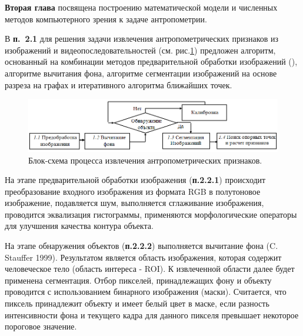 \textbf{Вторая глава} посвящена построению математической модели и численных методов компьютерного зрения к задаче антропометрии. 

В \textbf{п.~2.1} для решения задачи извлечения антропометрических признаков из изображений и видеопоследовательностей (см. рис.\ref{img53}) предложен алгоритм, основанный на комбинации  методов предварительной обработки изображений (), алгоритме вычитания фона, алгоритме сегментации изображений на основе разреза на графах и итеративного алгоритма ближайших точек.
\begin{figure}[ht!]
\centering
\includegraphics [width=1\linewidth] {images/h53.png}
\begin{center}
\caption{Блок-схема процесса извлечения антропометрических признаков.} \label{img53}
\end{center}
\end{figure}

На этапе предварительной обработки изображения (\textbf{п.2.2.1}) происходит преобразование входного изображения из формата RGB в полутоновое изображение, подавляется шум, выполняется сглаживание изображения, проводится эквализация гистограммы, применяются морфологические операторы для улучшения качества контура объекта.

На этапе обнаружения объектов (\textbf{п.2.2.2}) выполняется вычитание фона (C. Stauffer 1999). Результатом является область изображения, которая содержит человеческое тело (область интереса - ROI). К извлеченной области далее будет применена сегментация. Отбор пикселей, принадлежащих фону и объекту проводится с использованием бинарного изображения (маски). Считается, что пиксель принадлежит объекту и имеет белый цвет в маске, если разность интенсивности фона и текущего кадра для данного пикселя превышает некоторое пороговое значение.

